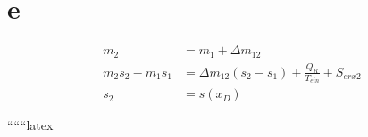 

\section*{e}

\begin{align*}
m_2 &= m_1 + \Delta m_{12} \\
m_2 s_2 - m_1 s_1 &= \Delta m_{12} (s_2 - s_1) + \frac{Q_R}{T_{ein}} + S_{erx2} \\
s_2 &= s(x_D)
\end{align*}

``````latex
